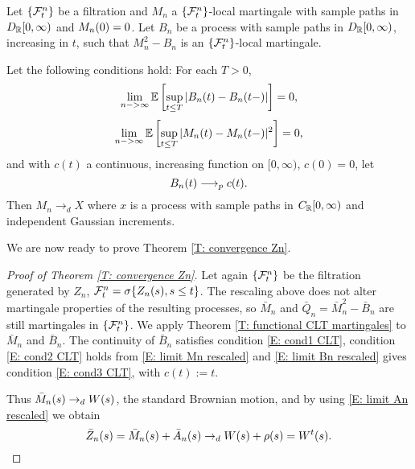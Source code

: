 \begin{theorem} \label{T: functional CLT martingales}
	Let $\{\mathcal{F}^n_{t}\}$ be a filtration and $M_n$ a $\{\mathcal{F}^n_{t}\}$-local martingale with sample paths in $D_{\mathbb{R}}[0,\infty)$ and $M_n(0)=0$.
	Let $B_n$ be a process with sample paths in $D_{\mathbb{R}}[0,\infty)$, increasing in $t$, such that $M_n^2 - B_n$ is an $\{\mathcal{F}^n_{t}\}$-local martingale.
	
	Let the following conditions hold:
	For each $T>0$,
	\begin{equation} \label{E: cond1 CLT}
	\lim_{n->\infty} \mathbb{E} \left[ 
	\sup_{t \leq T} | B_n(t) - B_n(t-)|
     \right] = 0,
	\end{equation}
	\begin{equation} \label{E: cond2 CLT}
	\lim_{n->\infty} \mathbb{E} \left[ 
		\sup_{t \leq T} | M_n(t) - M_n(t-)|^2
	 \right] = 0,
	\end{equation}
	and with $c(t)$ a continuous, increasing function on $[0, \infty)$, $c(0) = 0$, let
	\begin{equation} \label{E: cond3 CLT}
	B_n(t) \longrightarrow_p c(t).
	\end{equation}
	Then $M_n \longrightarrow_d X$ where $x$ is a process with sample paths in $C_{\mathbb{R}}[0,\infty)$ and independent Gaussian increments.
\end{theorem}

We are now ready to prove Theorem \ref{T: convergence Zn}.

\begin{proof}[Proof of Theorem \ref{T: convergence Zn}]
	Let again $\{\mathcal{F}^n_{t}\}$ be the filtration generated by $Z_n$, 
	$\mathcal{F}^n_{t} = \sigma \{ Z_n(s), s \leq t \}$.
	The rescaling above does not alter martingale properties of the resulting processes,
	so $\bar{M}_n$ and $\bar{Q}_n = \bar{M}_n^2 - \bar{B}_n$ are still martingales in $\{\mathcal{F}^n_{t}\}$.
	We apply Theorem \ref{T: functional CLT martingales} to $\bar{M}_n$ and $\bar{B}_n$.
	The continuity of $\bar{B}_n$ satisfies condition \ref{E: cond1 CLT}, 
	condition \ref{E: cond2 CLT} holds from \ref{E: limit Mn rescaled}
	and \ref{E: limit Bn rescaled} gives condition \ref{E: cond3 CLT}, with $c(t) := t$.
	
	Thus $\bar{M}_n(s) \rightarrow_d W(s)$, the standard Brownian motion, and by using \ref{E: limit An rescaled} we obtain
	\begin{equation*}
	\bar{Z}_n(s) = \bar{M}_n(s) + \bar{A}_n(s) \rightarrow_d W(s) + \rho (s) = W^t(s).
	\end{equation*}
	
	
		
\end{proof}













